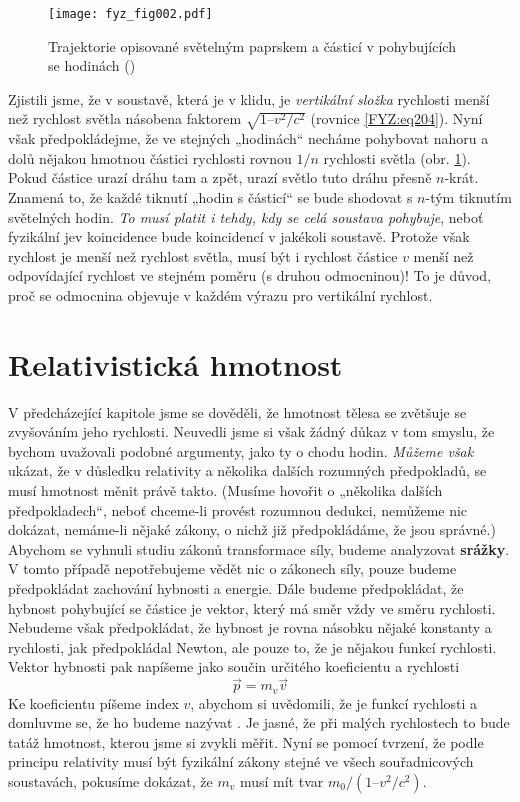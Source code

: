{    \begin{figure}[ht!]  %
      \centering
      \texttt{[image: fyz\_fig002.pdf]}
      \caption{Trajektorie opisované světelným paprskem a částicí v pohybujících se hodinách
               (\cite[s.~231]{Feynman01})}
      \label{fyz:fig002}
    \end{figure}
    Zjistili jsme, že v soustavě, která je v klidu, je \emph{vertikální složka} rychlosti menší než 
    rychlost světla násobena faktorem \(\sqrt{1 – v^2/c^2}\) (rovnice \ref{FYZ:eq204}). Nyní však 
    předpokládejme, že ve stejných „hodinách“ necháme pohybovat nahoru a dolů nějakou hmotnou 
    částici rychlosti rovnou \(1 /n\) rychlosti světla (obr. \ref{fyz:fig002}). Pokud částice urazí 
    dráhu tam a zpět, urazí světlo tuto dráhu přesně \(n\)-krát. Znamená to, že každé tiknutí 
    „hodin s částicí“ se bude shodovat s \(n\)-tým tiknutím světelných hodin. \emph{To musí platit 
    i tehdy, kdy se celá soustava pohybuje}, neboť fyzikální jev koincidence bude koincidencí v 
    jakékoli soustavě. Protože však rychlost je menší než rychlost světla, musí být i rychlost 
    částice \(v\) menší než odpovídající rychlost ve stejném poměru (s druhou odmocninou)! To je 
    důvod, proč se odmocnina objevuje v každém výrazu pro vertikální rychlost.
    
  \section{Relativistická hmotnost}\label{fyz:IchapXVIsecIV}
    V předcházející kapitole jsme se dověděli, že hmotnost tělesa se zvětšuje se zvyšováním jeho 
    rychlosti. Neuvedli jsme si však žádný důkaz v tom smyslu, že bychom uvažovali podobné 
    argumenty, jako ty o chodu hodin. \emph{Můžeme však} ukázat, že v důsledku relativity a 
    několika dalších rozumných předpokladů, se musí hmotnost měnit právě takto. (Musíme hovořit o 
    „několika dalších předpokladech“, neboť chceme-li provést rozumnou dedukci, nemůžeme nic 
    dokázat, nemáme-li nějaké zákony, o nichž již předpokládáme, že jsou správné.) Abychom se 
    vyhnuli studiu zákonů transformace síly, budeme analyzovat \textbf{srážky}. V tomto případě 
    nepotřebujeme vědět nic o zákonech síly, pouze budeme předpokládat zachování hybnosti a 
    energie. Dále budeme předpokládat, že hybnost pohybující se částice je vektor, který má směr 
    vždy ve směru rychlosti. Nebudeme však předpokládat, že hybnost je rovna násobku nějaké 
    konstanty a rychlosti, jak předpokládal Newton, ale pouze to, že je nějakou funkcí rychlosti. 
    Vektor hybnosti pak napíšeme jako součin určitého koeficientu a rychlosti
    \begin{equation}\label{FYZ:eq211}
      \vec{p} = m_v\vec{v}
    \end{equation}
    Ke koeficientu píšeme index \(v\), abychom si uvědomili, že je funkcí rychlosti a domluvme se, 
    že ho budeme nazývat . Je jasné, že při malých rychlostech to bude tatáž 
    hmotnost, kterou jsme si zvykli měřit. Nyní se pomocí tvrzení, že podle principu relativity 
    musí být fyzikální zákony stejné ve všech souřadnicových soustavách, pokusíme dokázat, že 
    \(m_v\) musí mít tvar \(m_0/(1 – v^2/c^2)\).
    
}
